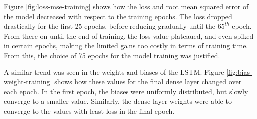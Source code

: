 \begin{center}
    \label{fig:loss-mse-training}
    \qquad
\end{center}

Figure \ref{fig:loss-mse-training} shows how the loss and root mean squared error of the model decreased with respect to the training epochs. The loss dropped drastically for the first 25 epochs, before reducing gradually until the $65^{th}$ epoch. From there on until the end of training, the loss value plateaued, and even spiked in certain epochs, making the limited gains too costly in terms of training time. From this, the choice of 75 epochs for the model training was justified.\par

A similar trend was seen in the weights and biases of the LSTM. Figure \ref{fig:bias-weight-training} shows how these values for the final dense layer changed over each epoch. In the first epoch, the biases were uniformly distributed, but slowly converge to a smaller value. Similarly, the dense layer weights were able to converge to the values with least loss in the final epoch.\par


